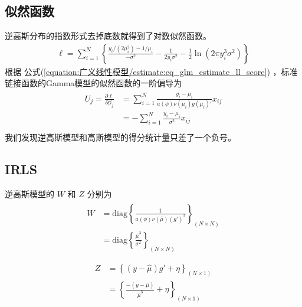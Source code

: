 \documentclass[letterpaper,10pt,english]{sphinxmanual}
\begin{document}
\subsection{似然函数}
\label{\detokenize{_u9006_u9ad8_u65af_u6a21_u578b/content:id5}}
逆高斯分布的指数形式去掉底数就得到了对数似然函数。
\begin{equation}\label{equation:逆高斯模型/content:逆高斯模型/content:10}
\begin{split}\ell= \sum_{i=1}^N  \left \{
\frac{ y_i/(2\mu^2_i) -1/\mu_i}{-\sigma^2}
- \frac{1}{2y_i\sigma^2}
- \frac{ 1}{2 } \ln \left( 2\pi y^3_i \sigma^2 \right)
\right \}\end{split}
\end{equation}
根据 公式(\ref{equation:广义线性模型/estimate:eq_glm_estimate_ll_score})
，标准链接函数的Gamma模型的似然函数的一阶偏导为
\begin{align}\label{equation:逆高斯模型/content:逆高斯模型/content:11}\!\begin{aligned}
U_j = \frac{\partial \ell}{\partial \beta_j}
&= \sum_{i=1}^N \frac{y_i-\mu_i}{a(\phi) \nu(\mu_i) g(\mu_i)' }  x_{ij}\\
&= - \sum_{i=1}^N \frac{y_i-\mu_i}{\sigma^2 }  x_{ij}\\
\end{aligned}\end{align}
我们发现逆高斯模型和高斯模型的得分统计量只差了一个负号。


\subsection{IRLS}
\label{\detokenize{_u9006_u9ad8_u65af_u6a21_u578b/content:irls}}
逆高斯模型的 \(W\) 和 \(Z\) 分别为
\begin{align}\label{equation:逆高斯模型/content:逆高斯模型/content:12}\!\begin{aligned}
W &= \text{diag} \left \{ \frac{ 1}{ a(\phi) \nu(\hat{\mu}) ( g' )^2}
\right \}_{(N\times N)}\\
&= \text{diag} \left \{ \frac{ \hat{\mu}^3}{ \sigma^2}
\right \}_{(N\times N)}\\
\end{aligned}\end{align}\begin{align}\label{equation:逆高斯模型/content:逆高斯模型/content:13}\!\begin{aligned}
Z &=   \left \{ (y- \hat{\mu}) g'  + \eta
\right \}_{(N\times 1 )}\\
&=   \left \{ \frac{-(y- \hat{\mu})}{ \hat{\mu}^3}  + \eta
\right \}_{(N\times 1 )}\\
\end{aligned}\end{align}
\end{document}
